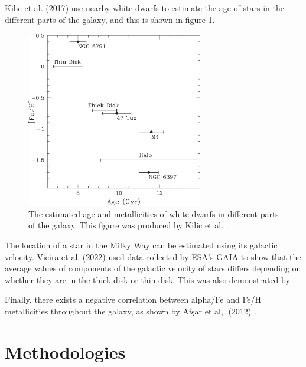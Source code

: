 \documentclass[a4paper,twocolumn,12pt]{article}
\begin{document}
Kilic et al. (2017) \cite{MilkyWayMetallicitiesNearbyWDs} use nearby white dwarfs to estimate the age of stars in the different parts of the galaxy, and this is shown in figure 1.
\begin{figure}[h!]
\centering
\includegraphics[width=77mm]{apjaa62a5f10_hr.jpg}
\vspace{-2mm}
\caption{The estimated age and metallicities of white dwarfs in different parts of the galaxy. This figure was produced by Kilic et al. \cite{MilkyWayMetallicitiesNearbyWDs}.}
\label{fig: Age-metallicity for WDs}
\end{figure}

The location of a star in the Milky Way can be estimated using its galactic velocity. Vieira et al. (2022)\cite{ThinAndThickDiskKinematics} used data collected by ESA's GAIA to show that the average values of components of the galactic velocity of stars differs depending on whether they are in the thick disk or thin disk. This was also demonstrated by \cite{ThickDisc}.

Finally, there exists a negative correlation between alpha/Fe and Fe/H metallicities throughout the galaxy, as shown by Afşar et al,. (2012) \cite{Afşar}.




\section{Methodologies}
\end{document}

